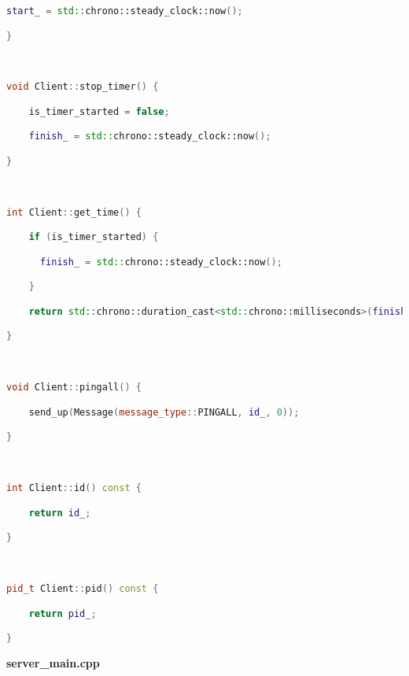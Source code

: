 \begin{lstlisting}[language=C++]
    start_ = std::chrono::steady_clock::now();

}



void Client::stop_timer() {

    is_timer_started = false;

    finish_ = std::chrono::steady_clock::now();

}



int Client::get_time() {

    if (is_timer_started) {

      finish_ = std::chrono::steady_clock::now();

    }

    return std::chrono::duration_cast<std::chrono::milliseconds>(finish_ - start_).count();

}



void Client::pingall() {

    send_up(Message(message_type::PINGALL, id_, 0));

}



int Client::id() const {

    return id_;

}



pid_t Client::pid() const {

    return pid_;

}

\end{lstlisting}

\textbf{server\_main.cpp}


